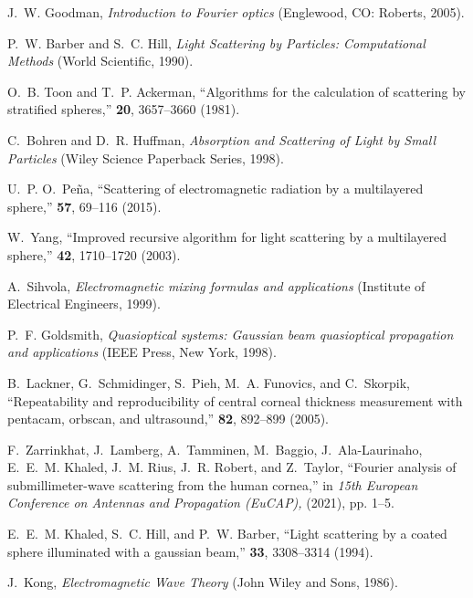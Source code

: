 \documentclass{osa-article}
\begin{document}
\begin{thebibliography}{10}
J.~W. Goodman, \emph{Introduction to Fourier optics} (Englewood, CO: Roberts,
  2005).

P.~W. Barber and S.~C. Hill, \emph{Light Scattering by Particles: Computational
  Methods} (World Scientific, 1990).

O.~B. Toon and T.~P. Ackerman, \enquote{Algorithms for the calculation of
  scattering by stratified spheres,} {\protect{}}
  \textbf{20}, 3657--3660 (1981).

C.~Bohren and D.~R. Huffman, \emph{Absorption and Scattering of Light by Small
  Particles} (Wiley Science Paperback Series, 1998).

U.~P. O.~Peña, \enquote{Scattering of electromagnetic radiation by a
  multilayered sphere,} {\protect{}}
  \textbf{57}, 69--116 (2015).

W.~Yang, \enquote{Improved recursive algorithm for light scattering by a
  multilayered sphere,} {\protect{}} \textbf{42},
  1710--1720 (2003).

A.~Sihvola, \emph{Electromagnetic mixing formulas and applications} (Institute
  of Electrical Engineers, 1999).

P.~F. Goldsmith, \emph{Quasioptical systems: Gaussian beam quasioptical
  propagation and applications} (IEEE Press, New York, 1998).

B.~Lackner, G.~Schmidinger, S.~Pieh, M.~A. Funovics, and C.~Skorpik,
  \enquote{Repeatability and reproducibility of central corneal thickness
  measurement with pentacam, orbscan, and ultrasound,}
  {\protect{}} \textbf{82}, 892--899 (2005).

F.~Zarrinkhat, J.~Lamberg, A.~Tamminen, M.~Baggio, J.~Ala-Laurinaho, E.~E.~M.
  Khaled, J.~M. Rius, J.~R. Robert, and Z.~Taylor, \enquote{Fourier analysis of
  submillimeter-wave scattering from the human cornea,} in \emph{15th European
  Conference on Antennas and Propagation (EuCAP),}  (2021), pp. 1--5.

E.~E.~M. Khaled, S.~C. Hill, and P.~W. Barber, \enquote{Light scattering by a
  coated sphere illuminated with a gaussian beam,} {\protect{}} \textbf{33}, 3308--3314 (1994).

J.~Kong, \emph{Electromagnetic Wave Theory} (John Wiley and Sons, 1986).


\end{thebibliography}
\end{document}
